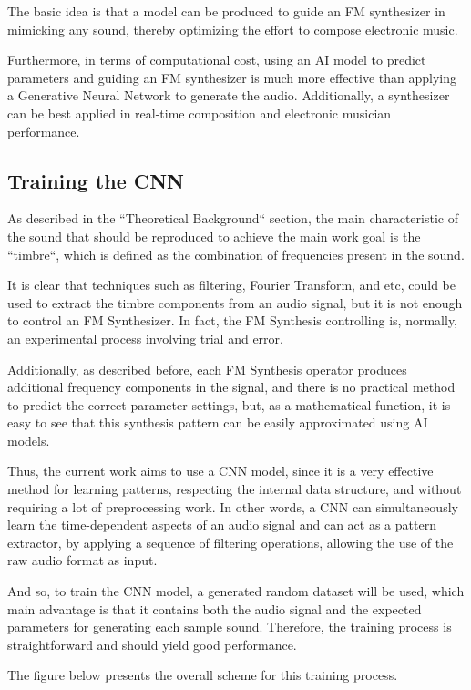 \documentclass[sigconf,natbib=false]{acmart}
\begin{document}
The basic idea is that a model can be produced to guide an FM synthesizer in mimicking any sound, thereby optimizing the effort to compose electronic music.

Furthermore, in terms of computational cost, using an AI model to predict parameters and guiding an FM synthesizer is much more effective than applying a Generative Neural Network to generate the audio. Additionally, a synthesizer can be best applied in real-time composition and electronic musician performance.

\subsection{Training the CNN}

As described in the ``Theoretical Background`` section, the main characteristic of the sound that should be reproduced to achieve the main work goal is the ``timbre``, which is defined as the combination of frequencies present in the sound.

It is clear that techniques such as filtering, Fourier Transform, and etc, could be used to extract the timbre components from an audio signal, but it is not enough to control an FM Synthesizer. In fact, the FM Synthesis controlling is, normally, an experimental process involving trial and error.

Additionally, as described before, each FM Synthesis operator produces additional frequency components in the signal, and there is no practical method to predict the correct parameter settings, but, as a mathematical function, it is easy to see that this synthesis pattern can be easily approximated using AI models.

Thus, the current work aims to use a CNN model, since it is a very effective method for learning patterns, respecting the internal data structure, and without requiring a lot of preprocessing work.
In other words, a CNN can simultaneously learn the time-dependent aspects of an audio signal and can act as a pattern extractor, by applying a sequence of filtering operations, allowing the use of the raw audio format as input.

And so, to train the CNN model, a generated random dataset will be used, which main advantage is that it contains both the audio signal and the expected parameters for generating each sample sound. Therefore, the training process is straightforward and should yield good performance.

The figure below presents the overall scheme for this training process.
\end{document}
